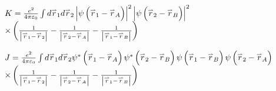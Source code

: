 $\begin{array}{l}
K = \frac{{e^2 }}{{4\pi \varepsilon _0 }}\int d\mathord{\buildrel{\lower3pt\hbox{$\scriptscriptstyle\rightharpoonup$}}
\over r} _1 d\mathord{\buildrel{\lower3pt\hbox{$\scriptscriptstyle\rightharpoonup$}}
\over r} _2 \left| {\psi \left( {\mathord{\buildrel{\lower3pt\hbox{$\scriptscriptstyle\rightharpoonup$}}
\over r} _1  - \mathord{\buildrel{\lower3pt\hbox{$\scriptscriptstyle\rightharpoonup$}}
\over r} _A } \right)} \right|^2 \left| {\psi \left( {\mathord{\buildrel{\lower3pt\hbox{$\scriptscriptstyle\rightharpoonup$}}
\over r} _2  - \mathord{\buildrel{\lower3pt\hbox{$\scriptscriptstyle\rightharpoonup$}}
\over r} _B } \right)} \right|^2  \\ \times  \left( {\frac{1}{{\left| {\mathord{\buildrel{\lower3pt\hbox{$\scriptscriptstyle\rightharpoonup$}}
\over r} _1  - \mathord{\buildrel{\lower3pt\hbox{$\scriptscriptstyle\rightharpoonup$}}
\over r} _2 } \right|}} - \frac{1}{{\left| {\mathord{\buildrel{\lower3pt\hbox{$\scriptscriptstyle\rightharpoonup$}}
\over r} _2  - \mathord{\buildrel{\lower3pt\hbox{$\scriptscriptstyle\rightharpoonup$}}
\over r} _A } \right|}} - \frac{1}{{\left| {\mathord{\buildrel{\lower3pt\hbox{$\scriptscriptstyle\rightharpoonup$}}
\over r} _1  - \mathord{\buildrel{\lower3pt\hbox{$\scriptscriptstyle\rightharpoonup$}}
\over r} _B } \right|}}} \right) \\
\end{array}$

$\begin{array}{l}
 J = \frac{{e^2 }}{{4\pi \varepsilon _0 }}\int {d\mathord{\buildrel{\lower3pt\hbox{$\scriptscriptstyle\rightharpoonup$}}
\over r} _1 d\mathord{\buildrel{\lower3pt\hbox{$\scriptscriptstyle\rightharpoonup$}}
\over r} _2 \psi ^* \left( {\mathord{\buildrel{\lower3pt\hbox{$\scriptscriptstyle\rightharpoonup$}}
\over r} _1  - \mathord{\buildrel{\lower3pt\hbox{$\scriptscriptstyle\rightharpoonup$}}
\over r} _A } \right)\psi ^* \left( {\mathord{\buildrel{\lower3pt\hbox{$\scriptscriptstyle\rightharpoonup$}}
\over r} _2  - \mathord{\buildrel{\lower3pt\hbox{$\scriptscriptstyle\rightharpoonup$}}
\over r} _B } \right)\psi \left( {\mathord{\buildrel{\lower3pt\hbox{$\scriptscriptstyle\rightharpoonup$}}
\over r} _1  - \mathord{\buildrel{\lower3pt\hbox{$\scriptscriptstyle\rightharpoonup$}}
\over r} _B } \right)\psi \left( {\mathord{\buildrel{\lower3pt\hbox{$\scriptscriptstyle\rightharpoonup$}}
\over r} _2  - \mathord{\buildrel{\lower3pt\hbox{$\scriptscriptstyle\rightharpoonup$}}
\over r} _A } \right)}  \\
  \times \left( {\frac{1}{{\left| {\mathord{\buildrel{\lower3pt\hbox{$\scriptscriptstyle\rightharpoonup$}}
\over r} _1  - \mathord{\buildrel{\lower3pt\hbox{$\scriptscriptstyle\rightharpoonup$}}
\over r} _2 } \right|}} - \frac{1}{{\left| {\mathord{\buildrel{\lower3pt\hbox{$\scriptscriptstyle\rightharpoonup$}}
\over r} _2  - \mathord{\buildrel{\lower3pt\hbox{$\scriptscriptstyle\rightharpoonup$}}
\over r} _A } \right|}} - \frac{1}{{\left| {\mathord{\buildrel{\lower3pt\hbox{$\scriptscriptstyle\rightharpoonup$}}
\over r} _1  - \mathord{\buildrel{\lower3pt\hbox{$\scriptscriptstyle\rightharpoonup$}}
\over r} _B } \right|}}} \right) \\
 \end{array}$

